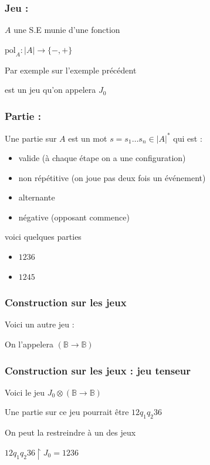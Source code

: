 \documentclass{beamer}
\begin{document}
\begin{frame}
\frametitle{Jeu :}

$A$ une S.E munie d'une fonction

$\text{pol}_A : |A| \rightarrow \{-, +\}$
\pause

Par exemple sur l'exemple précédent


est un jeu qu'on appelera $J_0$
\end{frame}

\begin{frame}
\frametitle{Partie :}

Une partie sur $A$ est un mot $s = s_1 \dots s_n \in |A|^*$ qui est :
\begin{itemize}
\item valide (à chaque étape on a une configuration)

\item non répétitive (on joue pas deux fois un événement)

\item alternante

\item négative (opposant commence)
\end{itemize}
\pause


voici quelques parties
\begin{itemize}
\item $1236$
\pause
\item $1245$
\end{itemize}
\end{frame}

\begin{frame}
\frametitle{Construction sur les jeux}

Voici un autre jeu :

On l'appelera $(\mathbb{B} \rightarrow \mathbb{B})$


\end{frame}

\begin{frame}
\frametitle{Construction sur les jeux : jeu tenseur}

Voici le jeu $J_0 \otimes (\mathbb{B} \rightarrow \mathbb{B})$

 
\pause

Une partie sur ce jeu pourrait être $1 2 q_1 q_2 3 6$

On peut la restreindre à un des jeux

$1 2 q_1 q_2 3 6 \upharpoonright J_0 = 1 2 3 6$
\end{frame}
\end{document}
